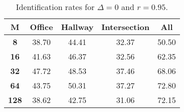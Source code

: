 \begin{table}[h]
    \footnotesize
    \centering
    \begin{tabular}{|c|c|c|c|l|}    
    \hline
    {\bf M} & {\bf Office} & {\bf Hallway} & {\bf Intersection} &     \multicolumn{1}{c|}{{\bf All}} \\ \hline
    {\bf 8} & 38.70 & 44.41 & 32.37 & 50.50 \\ \hline
    {\bf 16} & 41.63 & 46.37 & 32.56 & 62.35 \\ \hline
    {\bf 32} & 47.72 & 48.53 & 37.46 & 68.06 \\ \hline
    {\bf 64} & 43.75 & 50.31 & 37.27 & 72.80 \\ \hline
    {\bf 128} & 38.62 & 42.75 & 31.06 & 72.15 \\ \hline
    \end{tabular}
    \caption{Identification rates for $\Delta = 0$ and $r = 0.95$.}    
    \label{tab:identify_speakers_0.95_mit_19_0}
\end{table}
